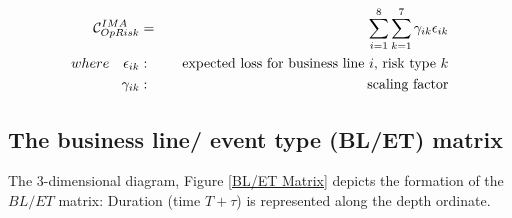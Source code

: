 \documentclass{DissertateUSU}
\begin{document}
\begin{eqnarray}
\mathcal{\Large{C}}_{OpRisk}^{IMA} &=& \sum_{i=1}^8 \sum_{k=1}^7 \gamma_{ik}\epsilon_{ik} \\
where \quad \epsilon_{ik}&:& \quad \mbox{expected loss for business line $i$, risk type $k$} \nonumber \\
      \gamma_{ik}&:& \quad \mbox{scaling factor} \nonumber
\end{eqnarray}

\subsection{The business line/ event type (BL/ET) matrix}

The 3-dimensional diagram, Figure \ref{BL/ET Matrix} depicts the
formation of the \(BL/ET\) matrix: Duration (time \(T+\tau\)) is
represented along the depth ordinate.
\end{document}
